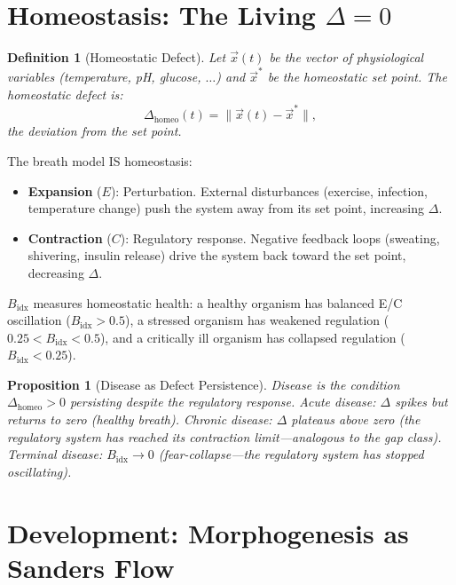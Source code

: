 \documentclass[12pt, openany]{book}
\newtheorem{proposition}[theorem]{Proposition}
\newtheorem{definition}[theorem]{Definition}
\theoremstyle{remark}
\begin{document}
\section{Homeostasis: The Living $\Delta = 0$}
\label{sec:homeostasis}

\begin{definition}[Homeostatic Defect]
\label{def:homeo-defect}
Let $\vec{x}(t)$ be the vector of physiological variables (temperature, pH, glucose,
$\ldots$) and $\vec{x}^*$ be the homeostatic set point.  The homeostatic defect is:
\[
  \Delta_{\mathrm{homeo}}(t) = \|\vec{x}(t) - \vec{x}^*\|,
\]
the deviation from the set point.
\end{definition}

\noindent
The breath model IS homeostasis:
\begin{itemize}
  \item \textbf{Expansion} ($E$): Perturbation.  External disturbances (exercise,
        infection, temperature change) push the system away from its set point,
        increasing $\Delta$.
  \item \textbf{Contraction} ($C$): Regulatory response.  Negative feedback loops
        (sweating, shivering, insulin release) drive the system back toward the
        set point, decreasing $\Delta$.
\end{itemize}

\noindent
$B_{\mathrm{idx}}$ measures homeostatic health: a healthy organism has balanced
E/C oscillation ($B_{\mathrm{idx}} > 0.5$), a stressed organism has weakened
regulation ($0.25 < B_{\mathrm{idx}} < 0.5$), and a critically ill organism has
collapsed regulation ($B_{\mathrm{idx}} < 0.25$).

\begin{proposition}[Disease as Defect Persistence]
\label{prop:disease}
Disease is the condition $\Delta_{\mathrm{homeo}} > 0$ persisting despite the
regulatory response.  Acute disease: $\Delta$ spikes but returns to zero (healthy
breath).  Chronic disease: $\Delta$ plateaus above zero (the regulatory system
has reached its contraction limit---analogous to the gap class).  Terminal disease:
$B_{\mathrm{idx}} \to 0$ (fear-collapse---the regulatory system has stopped
oscillating).
\end{proposition}


\section{Development: Morphogenesis as Sanders Flow}
\label{sec:development}
\end{document}
